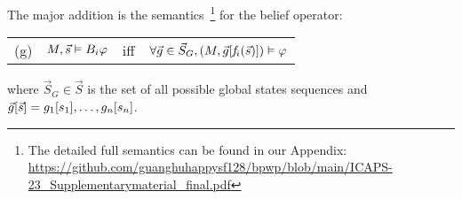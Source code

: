 The major addition is the semantics~\footnote{The detailed full semantics can be found in our Appendix: \url{https://github.com/guanghuhappysf128/bpwp/blob/main/ICAPS-23_Supplementarymaterial_final.pdf}} for the belief operator:

\vspace{2mm}
\noindent
\begin{tabular}{@{}l@{~}l@{~~}l@{~~}l}
    
    (g) & $M,\Vec{s} \vDash B_i \varphi$   & iff & $\forall \vec{g} \in \vec{S}_G, (M,  \vec{g}[\mathit{f}_i(\Vec{s})]) \vDash \varphi$ \\[1mm]

\end{tabular}
\vspace{2mm}


\noindent
where $\vec{S}_G \in \vec{S}$ is the set of all possible global states sequences and $\vec{g}[\Vec{s}] = g_1[s_1],\dots,g_n[s_n]$.



